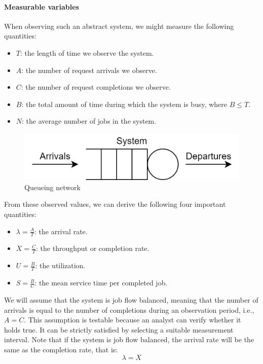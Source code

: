 \paragraph*{Measurable variables}
When observing such an abstract system, we might measure the following quantities:
\begin{itemize}
    \item $T$: the length of time we observe the system.
    \item $A$: the number of request arrivals we observe.
    \item $C$: the number of request completions we observe.
    \item $B$: the total amount of time during which the system is busy, where $B \leq T$.
    \item $N$: the average number of jobs in the system.
\end{itemize}
\begin{figure}[H]
    \centering
    \includegraphics[width=0.5\linewidth]{images/qn.png}
    \caption{Queueing network}
\end{figure}
From these observed values, we can derive the following four important quantities:
\begin{itemize}
    \item $\lambda=\frac{A}{T}$: the arrival rate. 
    \item $X=\frac{C}{T}$: the throughput or completion rate.
    \item $U=\frac{B}{T}$: the utilization.
    \item $S=\frac{B}{C}$: the mean service time per completed job.
\end{itemize}
We will assume that the system is job flow balanced, meaning that the number of arrivals is equal to the number of completions during an observation period, i.e., $A=C$. 
This assumption is testable because an analyst can verify whether it holds true. 
It can be strictly satisfied by selecting a suitable measurement interval.
Note that if the system is job flow balanced, the arrival rate will be the same as the completion rate, that is:
\[\lambda=X\]


